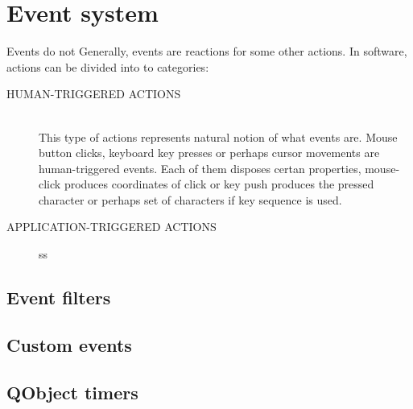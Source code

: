 \section{Event system}\label{section:events}
Events do not  Generally, events are reactions for some other actions. In software, actions can be divided into to categories:
\begin{description}
\item[HUMAN-TRIGGERED ACTIONS] \hfill \\
This type of actions represents natural notion of what events are. Mouse button clicks, keyboard key presses or perhaps cursor movements are human-triggered events. Each of them disposes certan properties, \eg mouse-click produces coordinates of click or key push produces the pressed character or perhaps set of characters if key sequence is used.
\item[APPLICATION-TRIGGERED ACTIONS]
ss
\end{description}



\subsection{Event filters}

\subsection{Custom events}

\subsection{QObject timers}